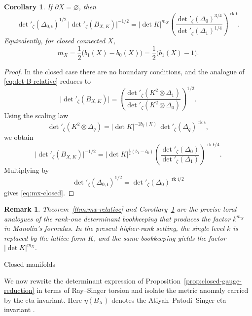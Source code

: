 \documentclass[12pt]{amsart}
\makeatletter
\renewcommand\subsection{\@startsection{subsection}{2}%
  \z@{.5\linespacing\@plus.7\linespacing}{-.5em}%
  {\normalfont\bfseries}}
\numberwithin{equation}{section}
\newtheorem{corollary}[theorem]{Corollary}
\newtheorem*{remark}{Remark}
\newcommand{\rk}{\operatorname{rk}}
\makeatother
\begin{document}
\begin{corollary}
\label{cor:mx-closed}
If \(\partial X=\varnothing\), then
\begin{equation}
\label{eq:mx-closed}
\det\nolimits'_{\zeta}(\Delta_{0,\mathfrak t})^{1/2}
\,
\bigl|\det\nolimits'_{\zeta}(B_{X,K})\bigr|^{-1/2}
=
|\det K|^{m_X}
\left(
\frac{
\det\nolimits'_{\zeta}(\Delta_0)^{3/4}
}{
\det\nolimits'_{\zeta}(\Delta_1)^{1/4}
}
\right)^{\rk \mathfrak t}.
\end{equation}
Equivalently, for closed connected \(X\),
\[
m_X=\frac12\bigl(b_1(X)-b_0(X)\bigr)=\frac12\bigl(b_1(X)-1\bigr).
\]
\end{corollary}

\begin{proof}
In the closed case there are no boundary conditions, and the analogue of
\eqref{eq:det-B-relative} reduces to
\[
\bigl|\det\nolimits'_{\zeta}(B_{X,K})\bigr|
=
\left(
\frac{
\det\nolimits'_{\zeta}(K^2\otimes \Delta_1)
}{
\det\nolimits'_{\zeta}(K^2\otimes \Delta_0)
}
\right)^{1/2}.
\]
Using the scaling law
\[
\det\nolimits'_{\zeta}(K^2\otimes \Delta_q)
=
|\det K|^{-2b_q(X)}\,
\det\nolimits'_{\zeta}(\Delta_q)^{\rk \mathfrak t},
\]
we obtain
\[
\bigl|\det\nolimits'_{\zeta}(B_{X,K})\bigr|^{-1/2}
=
|\det K|^{\frac12(b_1-b_0)}
\left(
\frac{
\det\nolimits'_{\zeta}(\Delta_0)
}{
\det\nolimits'_{\zeta}(\Delta_1)
}
\right)^{\rk \mathfrak t/4}.
\]
Multiplying by
\[
\det\nolimits'_{\zeta}(\Delta_{0,\mathfrak t})^{1/2}
=
\det\nolimits'_{\zeta}(\Delta_0)^{\rk \mathfrak t/2}
\]
gives \eqref{eq:mx-closed}.
\end{proof}

\begin{remark}
Theorem~\ref{thm:mx-relative} and Corollary~\ref{cor:mx-closed} are the precise toral
analogues of the rank-one determinant bookkeeping that produces the factor \(k^{m_X}\) in
Manoliu's formulas. In the present higher-rank setting, the single level \(k\) is replaced by
the lattice form \(K\), and the same bookkeeping yields the factor \(|\det K|^{m_X}\).
\end{remark}

\subsection{Closed manifolds}

We now rewrite the determinant expression of
Proposition~\ref{prop:closed-gauge-reduction} in terms of Ray--Singer torsion and isolate
the metric anomaly carried by the eta-invariant. Here \(\eta(B_X)\) denotes the Atiyah--Patodi--Singer eta-invariant \cite{Atiyah:1975jf}.
\end{document}

